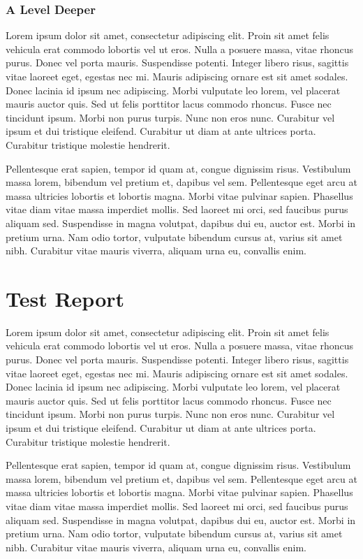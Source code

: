 \documentclass{vitmsprojectreport}
\begin{document}
\subsubsection{A Level Deeper}

Lorem ipsum dolor sit amet, consectetur adipiscing elit. Proin sit amet felis vehicula erat commodo lobortis vel ut eros. Nulla a posuere massa, vitae rhoncus purus. Donec vel porta mauris. Suspendisse potenti. Integer libero risus, sagittis vitae laoreet eget, egestas nec mi. Mauris adipiscing ornare est sit amet sodales. Donec lacinia id ipsum nec adipiscing. Morbi vulputate leo lorem, vel placerat mauris auctor quis. Sed ut felis porttitor lacus commodo rhoncus. Fusce nec tincidunt ipsum. Morbi non purus turpis. Nunc non eros nunc. Curabitur vel ipsum et dui tristique eleifend. Curabitur ut diam at ante ultrices porta. Curabitur tristique molestie hendrerit.

Pellentesque erat sapien, tempor id quam at, congue dignissim risus. Vestibulum massa lorem, bibendum vel pretium et, dapibus vel sem. Pellentesque eget arcu at massa ultricies lobortis et lobortis magna. Morbi vitae pulvinar sapien. Phasellus vitae diam vitae massa imperdiet mollis. Sed laoreet mi orci, sed faucibus purus aliquam sed. Suspendisse in magna volutpat, dapibus dui eu, auctor est. Morbi in pretium urna. Nam odio tortor, vulputate bibendum cursus at, varius sit amet nibh. Curabitur vitae mauris viverra, aliquam urna eu, convallis enim.

\section{Test Report}

Lorem ipsum dolor sit amet, consectetur adipiscing elit. Proin sit amet felis vehicula erat commodo lobortis vel ut eros. Nulla a posuere massa, vitae rhoncus purus. Donec vel porta mauris. Suspendisse potenti. Integer libero risus, sagittis vitae laoreet eget, egestas nec mi. Mauris adipiscing ornare est sit amet sodales. Donec lacinia id ipsum nec adipiscing. Morbi vulputate leo lorem, vel placerat mauris auctor quis. Sed ut felis porttitor lacus commodo rhoncus. Fusce nec tincidunt ipsum. Morbi non purus turpis. Nunc non eros nunc. Curabitur vel ipsum et dui tristique eleifend. Curabitur ut diam at ante ultrices porta. Curabitur tristique molestie hendrerit.

Pellentesque erat sapien, tempor id quam at, congue dignissim risus. Vestibulum massa lorem, bibendum vel pretium et, dapibus vel sem. Pellentesque eget arcu at massa ultricies lobortis et lobortis magna. Morbi vitae pulvinar sapien. Phasellus vitae diam vitae massa imperdiet mollis. Sed laoreet mi orci, sed faucibus purus aliquam sed. Suspendisse in magna volutpat, dapibus dui eu, auctor est. Morbi in pretium urna. Nam odio tortor, vulputate bibendum cursus at, varius sit amet nibh. Curabitur vitae mauris viverra, aliquam urna eu, convallis enim.
\end{document}
